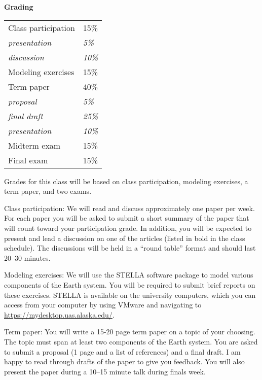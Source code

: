 \documentclass[11pt,letterpaper]{article}
\newcommand{\squeezeup}{\vspace{-2.5mm}}
\begin{document}
\clearpage
\textbf{Grading} 
\begin{table}[h!]
\squeezeup
\begin{tabular}{ll}
Class participation & 15\%\\
\hspace{15pt}\textit{presentation} &\hspace{15pt}\textit{5\%}\\
\hspace{15pt}\textit{discussion} & \hspace{15pt}\textit{10\%}\\
Modeling exercises & 15\%\\
Term paper & 40\%\\
\hspace{15pt}\textit{proposal} & \hspace{15pt}\textit{5\%}\\
\hspace{15pt}\textit{final draft} & \hspace{15pt}\textit{25\%}\\
\hspace{15pt}\textit{presentation} & \hspace{15pt}\textit{10\%}\\
Midterm exam & 15\%\\
Final exam & 15\%
\end{tabular}
\end{table}

Grades for this class will be based on class participation, modeling exercises, a term paper, and two exams.

Class participation: We will read and discuss approximately one paper per week. For each paper you will be asked to submit a short summary of the paper that will count toward your participation grade. In addition, you will be expected to present and lead a discussion on one of the articles (listed in bold in the class schedule). The discussions will be held in a ``round table'' format and should last 20--30 minutes. 

Modeling exercises: We will use the STELLA software package to model various components of the Earth system. You will be required to submit brief reports on these exercises. STELLA is available on the university computers, which you can access from your computer by using VMware and navigating to \url{https://mydesktop.uas.alaska.edu/}.

Term paper: You will write a 15-20 page term paper on a topic of your choosing. The topic must span at least two components of the Earth system. You are asked to submit a proposal (1 page and a list of references) and a final draft. I am happy to read through drafts of the paper to give you feedback. You will also present the paper during a 10--15 minute talk during finals week.
\end{document}
